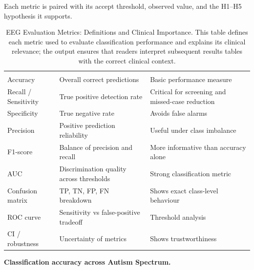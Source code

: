 \noindent Each metric is paired with its accept threshold, observed value, and the H1--H5 hypothesis it supports.
{\tablestripes\tablefontsize
\begin{xltabular}{\textwidth}{@{} l L L @{}}
\caption[EEG Evaluation Metrics: Definitions and Clinical Importance]{EEG Evaluation Metrics: Definitions and Clinical Importance. This table defines each metric used to evaluate classification performance and explains its clinical relevance; the output ensures that readers interpret subsequent results tables with the correct clinical context.}\label{tab:eeg_evaluation_metrics} \\
\toprule
{} &  &  \\
\midrule
\endfirsthead
\toprule
{} &  &  \\
\midrule
\endhead
\bottomrule
\endlastfoot
Accuracy & Overall correct predictions & Basic performance measure \\
Recall / Sensitivity & True positive detection rate & Critical for screening and missed-case reduction \\
Specificity & True negative rate & Avoids false alarms \\
Precision & Positive prediction reliability & Useful under class imbalance \\
F1-score & Balance of precision and recall & More informative than accuracy alone \\
AUC & Discrimination quality across thresholds & Strong classification metric \\
Confusion matrix & TP, TN, FP, FN breakdown & Shows exact class-level behaviour \\
ROC curve & Sensitivity vs false-positive tradeoff & Threshold analysis \\
CI / robustness & Uncertainty of metrics & Shows trustworthiness \\
\end{xltabular}}
\fi %


\noindent\textbf{Classification accuracy across Autism Spectrum.}

